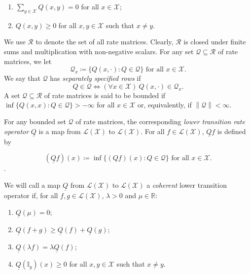 \documentclass[a4paper,reqno]{amsart}
\newcommand{\reals}{\mathbb{R}}
\newcommand{\states}{\mathcal{X}}
\newcommand{\gambles}{\mathcal{L}}
\newcommand{\gamblesX}{\gambles(\states)}
\newcommand{\ind}[1]{\mathbb{I}_{#1}}
\newcommand{\rateset}{\mathcal{Q}}
\newcommand{\lrate}{\underline{Q}}
\newcommand{\asa}{\Leftrightarrow}
\newcommand{\norm}[1]{\left\lVert #1 \right\rVert}
\begin{document}
\vspace{5pt}
\begin{enumerate}[label=R\arabic*:]
\item
$\sum_{y\in\states}Q(x,y)=0$ for all $x\in\states$;
\item
$Q(x,y)\geq0$ for all $x,y\in\states$ such that $x\neq y$.
\end{enumerate}
\vspace{5pt}
\noindent
We use $\mathcal{R}$ to denote the set of all rate matrices. Clearly, $\mathcal{R}$ is closed under finite sums and multiplication with non-negative scalars. For any set $\rateset\subseteq\mathcal{R}$ of rate matrices, we let
\begin{equation*}
\rateset_x\coloneqq\{Q(x,\cdot)\colon Q\in\rateset\}
\text{ for all $x\in\states$.}
\end{equation*}
We say that $\rateset$ has \emph{separately specified rows} if
\begin{equation*}
Q\in\rateset\asa(\forall x\in\states)~Q(x,\cdot)\in\rateset_x.
\end{equation*}
A set $\rateset\subseteq\mathcal{R}$ of rate matrices is said to be bounded if $\inf\{Q(x,x)\colon Q\in\rateset\}>-\infty$ for all $x\in\states$ or, equivalently, if $\norm{\rateset}<\infty$. 

For any bounded set $\rateset$ of rate matrices, the corresponding \emph{lower transition rate operator} $\lrate$ is a map from $\gamblesX$ to $\gamblesX$. For all $f\in\gamblesX$, $\lrate f$ is defined by

\begin{equation}\label{eq:deflowerbound}
(\lrate f)(x)\coloneqq\inf\{(Qf)(x)\colon Q\in\rateset\}\text{ for all $x\in\states$}.
\end{equation}.

We will call a map $\lrate$ from $\gamblesX$ to $\gamblesX$ a \emph{coherent} lower transition operator if, for all $f,g\in\gamblesX$, $\lambda>0$ and $\mu\in\reals$:

\vspace{5pt}
\begin{enumerate}[label=LR\arabic*:]
\item
$\lrate(\mu)=0$;
\item
$\lrate(f+g)\geq\lrate(f)+\lrate(g)$;
\item
$\lrate(\lambda f)=\lambda\lrate(f)$;
\item
$\lrate(\ind{y})(x)\geq0$ for all $x,y\in\states$ such that $x\neq y$.
\end{enumerate}
\vspace{5pt}
\end{document}
